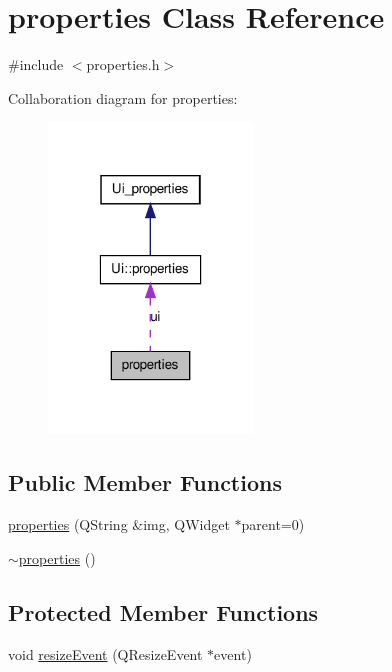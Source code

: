 \hypertarget{classproperties}{
\section{properties Class Reference}
\label{classproperties}
}


{\ttfamily \#include $<$properties.h$>$}



Collaboration diagram for properties:
\nopagebreak
\begin{figure}[H]
\begin{center}
\leavevmode
\includegraphics[width=154pt]{classproperties__coll__graph}
\end{center}
\end{figure}
\subsection*{Public Member Functions}
\begin{DoxyCompactItemize}
\item 
\hyperlink{classproperties_aa7592a90ccdf6a691b0fa2ca54f77641}{properties} (QString \&img, QWidget $\ast$parent=0)
\item 
\hyperlink{classproperties_af8e12abaf059c045cf3f8205b0f5f383}{$\sim$properties} ()
\end{DoxyCompactItemize}
\subsection*{Protected Member Functions}
\begin{DoxyCompactItemize}
\item 
void \hyperlink{classproperties_ad0211b85fbce4b735d5d8ee5a6680de3}{resizeEvent} (QResizeEvent $\ast$event)
\end{DoxyCompactItemize}



